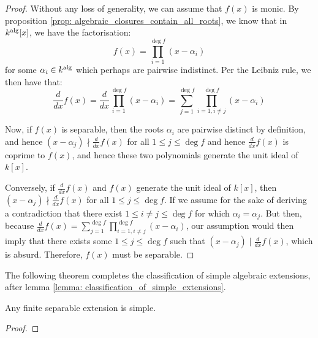             \begin{proof}
                Without any loss of generality, we can assume that $f(x)$ is monic. By proposition \ref{prop: algebraic_closures_contain_all_roots}, we know that in $k^{\mathrm{alg}}[x]$, we have the factorisation:
                    $$f(x) = \prod_{i = 1}^{\deg f} (x - \alpha_i)$$
                for some $\alpha_i \in k^{\mathrm{alg}}$ which perhaps are pairwise indistinct. Per the Leibniz rule, we then have that:
                    $$\frac{d}{dx} f(x) = \frac{d}{dx} \prod_{i = 1}^{\deg f} (x - \alpha_i) = \sum_{j = 1}^{\deg f} \prod_{i = 1, i \not = j}^{\deg f} (x - \alpha_i)$$

                Now, if $f(x)$ is separable, then the roots $\alpha_i$ are pairwise distinct by definition, and hence $(x - \alpha_j) \nmid \frac{d}{dx} f(x)$ for all $1 \leq j \leq \deg f$ and hence $\frac{d}{dx} f(x)$ is coprime to $f(x)$, and hence these two polynomials generate the unit ideal of $k[x]$.

                Conversely, if $\frac{d}{dx} f(x)$ and $f(x)$ generate the unit ideal of $k[x]$, then $(x - \alpha_j) \nmid \frac{d}{dx} f(x)$ for all $1 \leq j \leq \deg f$. If we assume for the sake of deriving a contradiction that there exist $1 \leq i \not = j \leq \deg f$ for which $\alpha_i = \alpha_j$. But then, because $\frac{d}{dx} f(x) = \sum_{j = 1}^{\deg f} \prod_{i = 1, i \not = j}^{\deg f} (x - \alpha_i)$, our assumption would then imply that there exists some $1 \leq j \leq \deg f$ such that $(x - \alpha_j) \mid \frac{d}{dx} f(x)$, which is absurd. Therefore, $f(x)$ must be separable.
            \end{proof}

        The following theorem completes the classification of simple algebraic extensions, after lemma \ref{lemma: classification_of_simple_extensions}.
        \begin{theorem} \label{theorem: finite_separable_extensions_are_simple}
            Any finite separable extension is simple.
        \end{theorem}
            \begin{proof}
                
            \end{proof}

